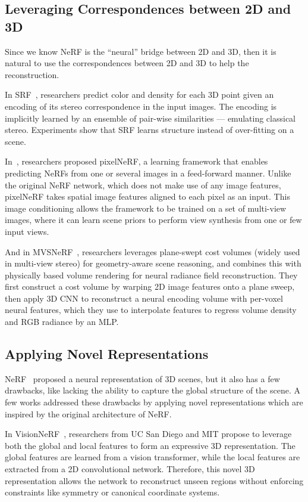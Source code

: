 \documentclass[10pt,twocolumn,letterpaper]{article}
\begin{document}
\subsection{Leveraging Correspondences between 2D and 3D}

Since we know NeRF is the “neural” bridge between 2D and 3D, then it is natural to use the correspondences between 2D and 3D to help the reconstruction.

In SRF~\cite{SRF}, researchers predict color and density for each 3D point given an encoding of its stereo correspondence in the input images. The encoding is implicitly learned by an ensemble of pair-wise similarities — emulating classical stereo. Experiments show that SRF learns structure instead of over-fitting on a scene.

In~\cite{yu2020pixelnerf}, researchers proposed pixelNeRF, a learning framework that enables predicting NeRFs from one or several images in a feed-forward manner. Unlike the original NeRF network, which does not make use of any image features, pixelNeRF takes spatial image features aligned to each pixel as an input. This image conditioning allows the framework to be trained on a set of multi-view images, where it can learn scene priors to perform view synthesis from one or few input views.

And in MVSNeRF~\cite{mvsnerf}, researchers leverages plane-swept cost volumes (widely used in multi-view stereo) for geometry-aware scene reasoning, and combines this with physically based volume rendering for neural radiance field reconstruction.
They first construct a cost volume by warping 2D image features onto a plane sweep, then apply 3D CNN to reconstruct a neural encoding volume with per-voxel neural features, which they use to interpolate features to regress volume density and RGB radiance by an MLP.

\subsection{Applying Novel Representations}

NeRF~\cite{mildenhall2020nerf} proposed a neural representation of 3D scenes, but it also has a few drawbacks, like lacking the ability to capture the global structure of the scene. A few works addressed these drawbacks by applying novel representations which are inspired by the original architecture of NeRF.

In VisionNeRF~\cite{lin2023visionnerf}, researchers from UC San Diego and MIT propose to leverage both the global and local features to form an expressive 3D representation. The global features are learned from a vision transformer, while the local features are extracted from a 2D convolutional network. 
Therefore, this novel 3D representation allows the network to reconstruct unseen regions without enforcing constraints like symmetry or canonical coordinate systems.
\end{document}
